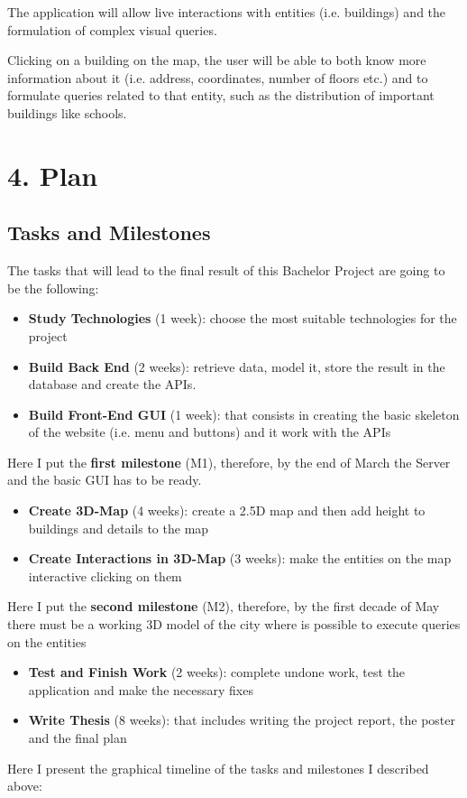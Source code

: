 \documentclass[a4paper]{article}
\begin{document}
The application will allow live interactions with entities (i.e. buildings) and the formulation of complex visual queries.


Clicking on a building on the map, the user will be able to both know more information about it (i.e. address, coordinates, number of floors etc.) and to formulate queries related to that entity, such as the distribution of important buildings like schools.
\section*{4. Plan}
\subsection*{Tasks and Milestones}
The tasks that will lead to the final result of this Bachelor Project are going to be the following:
\begin{itemize}
	\item {\bf Study Technologies} (1 week): choose the most suitable technologies for the project
	\item {\bf Build Back End} (2 weeks): retrieve data, model it, store the result in the database and create the APIs.
	\item {\bf Build Front-End GUI} (1 week): that consists in creating the basic skeleton of the website (i.e. menu and buttons) and it work with the APIs
\end{itemize}
Here I put the {\bf first milestone} (M1), therefore, by the end of March the Server and the basic GUI has to be ready.
\begin{itemize}
	\item {\bf Create 3D-Map} (4 weeks): create a 2.5D map and then add height to buildings and details to the map
	\item {\bf Create Interactions in 3D-Map} (3 weeks): make the entities on the map interactive clicking on them
\end{itemize}
Here I put the {\bf second milestone} (M2), therefore, by the first decade of May there must be a working 3D model of the city where is possible to execute queries on the entities
\begin{itemize}
	\item {\bf Test and Finish Work} (2 weeks): complete undone work, test the application and make the necessary fixes
	\item {\bf Write Thesis} (8 weeks): that includes writing the project report, the poster and the final plan
\end{itemize}
Here I present the graphical timeline of the tasks and milestones I described above:\\
\end{document}
